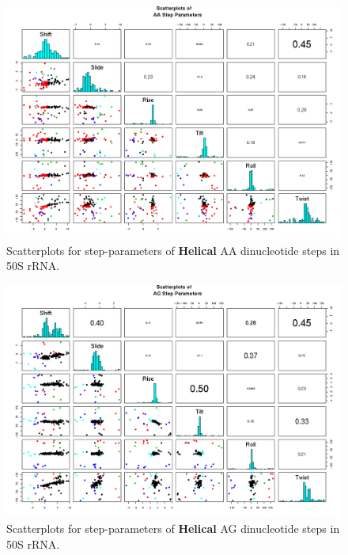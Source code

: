 \begin{figure}[H]
\centering
\includegraphics[angle=90, scale=0.6]{Helical/AA.png}
\caption{Scatterplots for step-parameters of \textbf{Helical} AA dinucleotide steps
in 50S rRNA.}
\label{fig:stepsAA}
\end{figure}

\begin{figure}[H]
\centering
\includegraphics[angle=90, scale=0.6]{Helical/AG.png}
\caption{Scatterplots for step-parameters of \textbf{Helical} AG dinucleotide steps
in 50S rRNA.}
\label{fig:stepsAG}
\end{figure}

